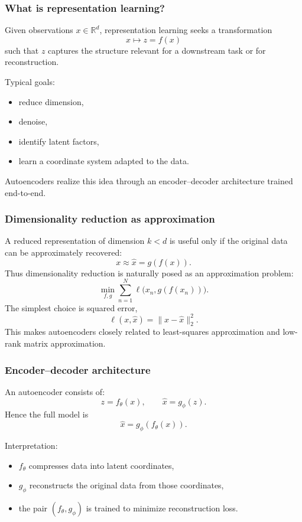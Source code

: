 \documentclass{beamer}
\begin{document}
\begin{frame}
\frametitle{What is representation learning?}

Given observations \(x\in\mathbb{R}^d\), representation learning seeks a transformation
\[
x \mapsto z = f(x)
\]
such that \(z\) captures the structure relevant for a downstream task or for reconstruction.

\begin{block}{Typical goals: }
\begin{itemize}
\item reduce dimension,

\item denoise,

\item identify latent factors,

\item learn a coordinate system adapted to the data.
\end{itemize}

\noindent
Autoencoders realize this idea through an encoder--decoder architecture trained end-to-end.
\end{block}
\end{frame}

\begin{frame}
\frametitle{Dimensionality reduction as approximation}

A reduced representation of dimension \(k<d\) is useful only if the original data can be approximately recovered:
\[
x \approx \hat x = g(f(x)).
\]
Thus dimensionality reduction is naturally posed as an approximation problem:
\[
\min_{f,g} \sum_{n=1}^N \ell\bigl(x_n,g(f(x_n))\bigr).
\]
The simplest choice is squared error,
\[
\ell(x,\hat x)=\|x-\hat x\|_2^2.
\]
This makes autoencoders closely related to least-squares approximation and low-rank matrix approximation.
\end{frame}

\begin{frame}
\frametitle{Encoder--decoder architecture}

An autoencoder consists of:
\[
z = f_\theta(x), \qquad \hat x = g_\phi(z).
\]
Hence the full model is
\[
\hat x = g_\phi(f_\theta(x)).
\]
\begin{block}{Interpretation: }
\begin{itemize}
\item \(f_\theta\) compresses data into latent coordinates,

\item \(g_\phi\) reconstructs the original data from those coordinates,

\item the pair \((f_\theta,g_\phi)\) is trained to minimize reconstruction loss.
\end{itemize}

\noindent
\end{block}
\end{frame}
\end{document}
